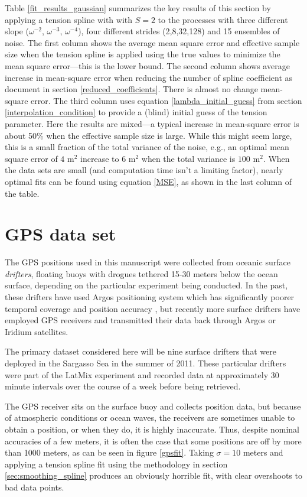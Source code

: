 \documentclass[10pt,journal]{IEEEtran}
\begin{document}
Table \ref{fit_results_gaussian} summarizes the key results of this section by applying a tension spline with with $S=2$ to the processes with three different slope ($\omega^{-2}$, $\omega^{-3}$, $\omega^{-4}$), four different strides (2,8,32,128) and 15 ensembles of noise. The first column shows the average mean square error and effective sample size when the tension spline is applied using the true values to minimize the mean square error---this is the lower bound. The second column shows average increase in mean-square error when reducing the number of spline coefficient as document in section \ref{reduced_coefficients}. There is almost no change mean-square error. The third column uses equation \ref{lambda_initial_guess} from section \ref{interpolation_condition} to provide a (blind) initial guess of the tension parameter. Here the results are mixed---a typical increase in mean-square error is about 50\% when the effective sample size is large. While this might seem large, this is a small fraction of the total variance of the noise, e.g., an optimal mean square error of $4$ m$^2$ increase to $6$ m$^2$ when the total variance is $100$ m$^2$. When the data sets are small (and computation time isn't a limiting factor), nearly optimal fits can be found using equation \ref{MSE}, as shown in the last column of the table.

\section{GPS data set}
\label{sec:drifter_data_set}

The GPS positions used in this manuscript were collected from oceanic surface \emph{drifters}, floating buoys with drogues tethered 15-30 meters below the ocean surface, depending on the particular experiment being conducted. In the past, these drifters have used Argos positioning system which has significantly poorer temporal coverage and position accuracy \cite{elipot2016-jgr}, but recently more surface drifters have employed GPS receivers and transmitted their data back through Argos or Iridium satellites.

The primary dataset considered here will be nine surface drifters that were deployed in the Sargasso Sea in the summer of 2011. These particular drifters were part of the LatMix experiment \cite{shcherbina2015-bams} and recorded data at approximately 30 minute intervals over the course of a week before being retrieved.

The GPS receiver sits on the surface buoy and collects position data, but because of atmospheric conditions or ocean waves, the receivers are sometimes unable to obtain a position, or when they do, it is highly inaccurate. Thus, despite nominal accuracies of a few meters, it is often the case that some positions are off by more than 1000 meters, as can be seen in figure \ref{gpsfit}. Taking $\sigma=10$ meters and applying a tension spline fit using the methodology in section \ref{sec:smoothing_spline} produces an obviously horrible fit, with clear overshoots to bad data points.
\end{document}
